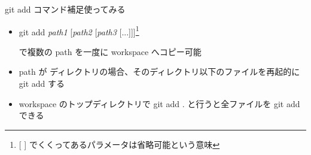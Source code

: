 \begin{frame}[t]{git add コマンド補足}{使ってみる}

  \begin{itemize}
  \item git add \textit{path1} [\textit{path2} [\textit{path3} [...]]]\footnote{[ ] でくくってあるパラメータは省略可能という意味}

    で複数の path を一度に workspace へコピー可能
    \vspace{2ex}

  \item path が ディレクトリの場合、そのディレクトリ以下のファイルを再起的に git add する
    \vspace{2ex}

  \item workspace のトップディレクトリで git add . と行うと全ファイルを git add できる
  \end{itemize}

\end{frame}
